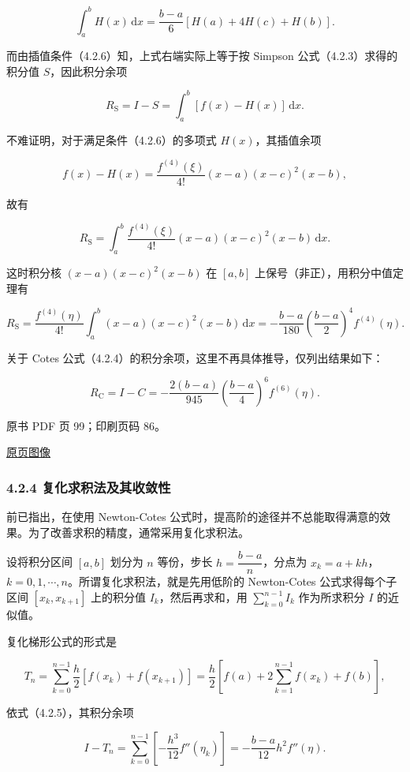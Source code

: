 \[
\int_a^b H(x)\,\mathrm{d}x=\frac{b-a}{6}[H(a)+4H(c)+H(b)].
\]

而由插值条件（4.2.6）知，上式右端实际上等于按 Simpson 公式（4.2.3）求得的积分值 \(S\)，因此积分余项

\[
R_{\mathrm{S}}=I-S=\int_a^b[f(x)-H(x)]\,\mathrm{d}x.
\]

不难证明，对于满足条件（4.2.6）的多项式 \(H(x)\)，其插值余项

\[
f(x)-H(x)=\frac{f^{(4)}(\xi)}{4!}(x-a)(x-c)^2(x-b),
\]

故有

\[
R_{\mathrm{S}}=\int_a^b\frac{f^{(4)}(\xi)}{4!}(x-a)(x-c)^2(x-b)\,\mathrm{d}x.
\]

这时积分核 \((x-a)(x-c)^2(x-b)\) 在 \([a,b]\) 上保号（非正），用积分中值定理有

\[
R_{\mathrm{S}}=\frac{f^{(4)}(\eta)}{4!}\int_a^b(x-a)(x-c)^2(x-b)\,\mathrm{d}x
=-\frac{b-a}{180}\left(\frac{b-a}{2}\right)^4f^{(4)}(\eta).
\tag{4.2.7}
\]

关于 Cotes 公式（4.2.4）的积分余项，这里不再具体推导，仅列出结果如下：

\[
R_{\mathrm{C}}=I-C=-\frac{2(b-a)}{945}\left(\frac{b-a}{4}\right)^6f^{(6)}(\eta).
\tag{4.2.8}
\]

\clearpage

原书 PDF 页 99；印刷页码 86。

\href{source-images/pdf-099.jpeg}{原页图像}

\subsubsection{4.2.4 复化求积法及其收敛性}\label{ch04a-ux590dux5316ux6c42ux79efux6cd5ux53caux5176ux6536ux655bux6027}

前已指出，在使用 Newton-Cotes 公式时，提高阶的途径并不总能取得满意的效果。为了改善求积的精度，通常采用复化求积法。

设将积分区间 \([a,b]\) 划分为 \(n\) 等份，步长 \(h=\dfrac{b-a}{n}\)，分点为 \(x_k=a+kh\)，\(k=0,1,\cdots,n\)。所谓复化求积法，就是先用低阶的 Newton-Cotes 公式求得每个子区间 \([x_k,x_{k+1}]\) 上的积分值 \(I_k\)，然后再求和，用 \(\displaystyle\sum_{k=0}^{n-1}I_k\) 作为所求积分 \(I\) 的近似值。

复化梯形公式的形式是

\[
T_n=\sum_{k=0}^{n-1}\frac h2[f(x_k)+f(x_{k+1})]
=\frac h2\left[f(a)+2\sum_{k=1}^{n-1}f(x_k)+f(b)\right],
\tag{4.2.9}
\]

依式（4.2.5），其积分余项

\[
I-T_n=\sum_{k=0}^{n-1}\left[-\frac{h^3}{12}f''(\eta_k)\right]
=-\frac{b-a}{12}h^2f''(\eta).
\tag{4.2.10}
\]


